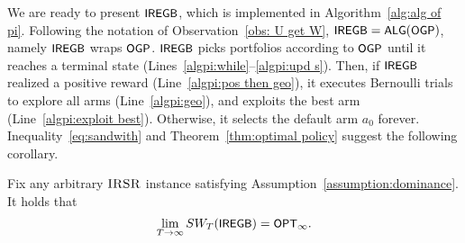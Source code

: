 We are ready to present $\SEGB$, which is implemented in Algorithm~\ref{alg:alg of pi}. Following the notation of Observation~\ref{obs: U get W}, ${\small\textnormal{\textsf{IREGB}}}={\small\textnormal{\textsf{ALG}}}({\small\textnormal{\textsf{OGP}}})$, namely $\SEGB$ wraps ${\small\textnormal{\textsf{OGP}}}$. $\SEGB$ picks portfolios according to ${\small\textnormal{\textsf{OGP}}}$ until it reaches a terminal state (Lines~\ref{algpi:while}--\ref{algpi:upd s}). Then, if $\SEGB$ realized a positive reward (Line~\ref{algpi:pos then geo}), it executes Bernoulli trials to explore all arms (Line~\ref{algpi:geo}), and exploits the best arm (Line~\ref{algpi:exploit best}). Otherwise, it selects the default arm $a_0$ forever. Inequality~\eqref{eq:sandwith} and Theorem~\ref{thm:optimal policy} suggest the following corollary.
\begin{corollary}\label{cor: alg is asym opt}
Fix any arbitrary $\textsc{IRSR}$ instance satisfying Assumption~\ref{assumption:dominance}. It holds that 
\[\lim\limits_{T \rightarrow \infty }SW_T({\small\textnormal{\textsf{IREGB}}}) = {\small\textnormal{\textsf{OPT}}}_{\infty}.
\]
\end{corollary}

\iffalse
\begin{algorithm}[t]
\caption{Individually Rational Exploration via GMDP and Bernoulli Trials ($\SEGB$)\label{alg:alg of pi}}
\DontPrintSemicolon
\SetAlgoLined

$s \gets A$\\[1mm]

\While{$\OGP(s) \neq \emptyset$}{
    \nllabel{algpi:while}
    select $\OGP(s)$, and denote the realized action by $a_k$
    \nllabel{algpi:play with ogp}\\
    $s \gets s \setminus \{a_k\}$\\
    \nllabel{algpi:upd s}
}
\If{$x_{a_k} > 0$ for some $a_k \in A$}{
    \nllabel{algpi:pos then geo}
    $a_{k^\star} \gets \argmax_{a_i} x(a_i)$ \tcp*{\texttt{\color{blue}{\#best among all the explored arms}}}\\
    execute Bernoulli trials mixing $a_{k^\star}$ with every other unexplored arm until all are revealed\\
    \nllabel{algpi:geo}\\
    select the best arm forever\\
    \nllabel{algpi:exploit best}
}
\Else{
    select the default arm $a_0$ forever\\
    \nllabel{algpi:exploit a0}
}
\end{algorithm}
\fi





